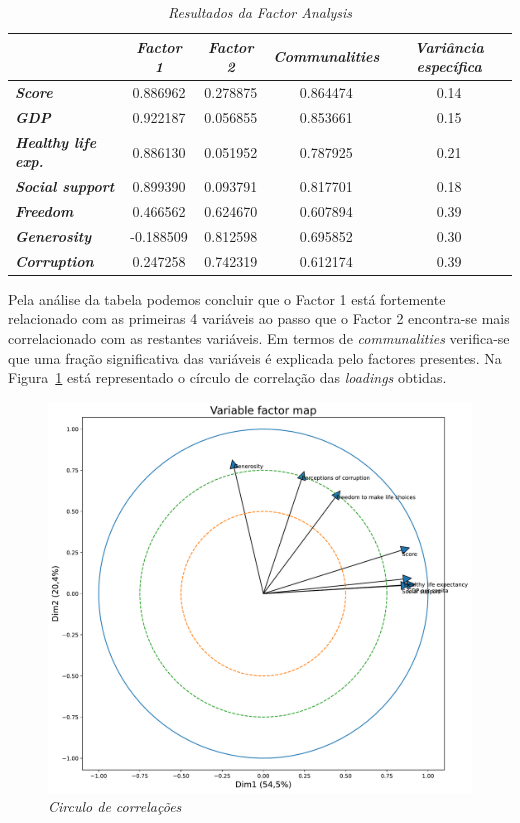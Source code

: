 \documentclass[12pt, a4paper]{article}
\begin{document}
\begin{table}[h]
\centering
\begin{tabular}{l|c|c|c|c|}
\cline{2-5}
 & \textit{\textbf{Factor 1}} & \textit{\textbf{Factor 2}} & \textit{\textbf{Communalities}} & \textit{\textbf{Variância específica}} \\ \hline
\multicolumn{1}{|l|}{\textit{\textbf{Score}}} & 0.886962 & 0.278875 & 0.864474 & 0.14 \\ \hline
\multicolumn{1}{|l|}{\textit{\textbf{GDP}}} & 0.922187 & 0.056855 & 0.853661 & 0.15 \\ \hline
\multicolumn{1}{|l|}{\textit{\textbf{Healthy life exp.}}} & 0.886130 & 0.051952 & 0.787925 & 0.21 \\ \hline
\multicolumn{1}{|l|}{\textit{\textbf{Social support}}} & 0.899390 & 0.093791 & 0.817701 & 0.18 \\ \hline
\multicolumn{1}{|l|}{\textit{\textbf{Freedom}}} & 0.466562 & 0.624670 & 0.607894 & 0.39 \\ \hline
\multicolumn{1}{|l|}{\textit{\textbf{Generosity}}} & -0.188509 & 0.812598 & 0.695852 & 0.30 \\ \hline
\multicolumn{1}{|l|}{\textit{\textbf{Corruption}}} & 0.247258 & 0.742319 & 0.612174 & 0.39 \\ \hline
\end{tabular}
\caption{\emph{Resultados da Factor Analysis}}
\label{tab:tab5}
\end{table}

Pela análise da tabela podemos concluir que o Factor 1 está fortemente
relacionado com as primeiras 4 variáveis ao passo que o Factor 2
encontra-se mais correlacionado com as restantes variáveis. Em termos de
\emph{communalities} verifica-se que uma fração significativa das
variáveis é explicada pelo factores presentes. Na Figura~\ref{fig:fig9} está
representado o círculo de correlação das \emph{loadings} obtidas.

\begin{figure}[h!]
\includegraphics[scale=0.40]{VariableFactorMap2.pdf}
\centering
\caption{\emph{Circulo de correlações}}
\label{fig:fig9}
\end{figure}
\end{document}

